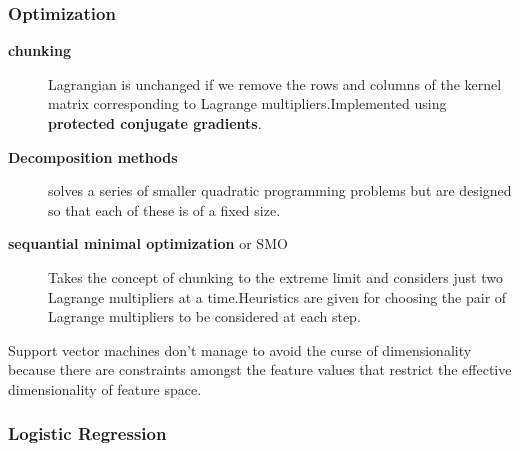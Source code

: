 \subsubsection{Optimization}
\begin{description}
	\item[\textbf{chunking}]Lagrangian is unchanged if we remove the rows and columns of the kernel matrix corresponding to Lagrange multipliers.Implemented using \textbf{protected conjugate gradients}.
	\item[\textbf{Decomposition methods}] solves a series of smaller quadratic programming problems but are designed so that each of these is of a fixed size.
	\item[\textbf{sequantial minimal optimization} or SMO] Takes the concept of chunking to the extreme limit and considers just two Lagrange multipliers at a time.Heuristics are given for choosing the pair of Lagrange multipliers to be considered at each step.
\end{description}

Support vector machines don't manage to avoid the curse of dimensionality because there are constraints amongst the feature values that restrict the effective dimensionality of feature space.

\subsubsection{Logistic Regression}












